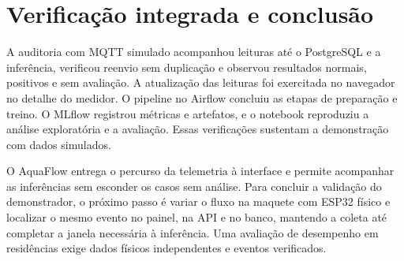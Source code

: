 \documentclass[12pt]{article}
\begin{document}
\section{Verificação integrada e conclusão}
A auditoria com MQTT simulado acompanhou leituras até o PostgreSQL e a inferência, verificou reenvio sem duplicação e observou resultados normais, positivos e sem avaliação. A atualização das leituras foi exercitada no navegador no detalhe do medidor. O pipeline no Airflow concluiu as etapas de preparação e treino. O MLflow registrou métricas e artefatos, e o notebook reproduziu a análise exploratória e a avaliação. Essas verificações sustentam a demonstração com dados simulados.

O AquaFlow entrega o percurso da telemetria à interface e permite acompanhar as inferências sem esconder os casos sem análise. Para concluir a validação do demonstrador, o próximo passo é variar o fluxo na maquete com ESP32 físico e localizar o mesmo evento no painel, na API e no banco, mantendo a coleta até completar a janela necessária à inferência. Uma avaliação de desempenho em residências exige dados físicos independentes e eventos verificados.



\end{document}
